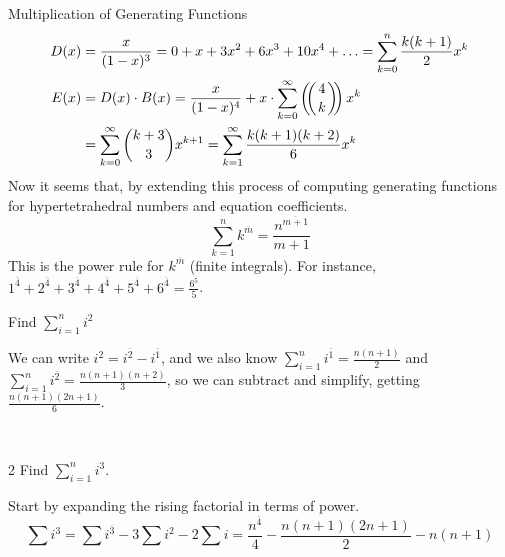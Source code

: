 \begin{subsection}{Multiplication of Generating Functions}
\begin{align*}
    D(x) &= \frac{x}{(1-x)^3} = 0 + x + 3x^2 + 6x^3 + 10x^4 + \ldots = \sum_{k = 0}^{n}\frac{k(k+1)}{2}x^k \\
    E(x) &= D(x)\cdot B(x) = \frac{x}{(1-x)^4} + x\cdot \sum_{k=0}^\infty \multiset{4}{k}x^k \\
    &= \sum_{k=0}^\infty \binom{k+3} 3 x^{k+1} = \sum_{k=1}^\infty \frac{k(k+1)(k+2)}{6}x^k
\end{align*}
Now it seems that, by extending this process of computing generating functions for hypertetrahedral numbers and equation coefficients. 
$$\sum_{k=1}^n k^{\overline{m}} = \frac{n^{\overline{m+1}}}{m+1}$$
This is the power rule for $k^{\overline{m}}$ (finite integrals).
For instance, $1^{\overline{4}} + 2^{\overline{4}} + 3^{\overline{4}} + 4^{\overline{4}} + 5^{\overline{4}} + 6^{\overline{4}} = \frac{6^{\overline{5}}}{5}$.
\begin{problem}{1}
Find $\sum_{i=1}^n i^2$
\end{problem}
\begin{solution}
We can write $i^2 = i^{\overline{2}} - i^{\overline{1}}$, and we also know
$\sum_{i=1}^n i^{\overline{1}} = \frac{n(n+1)}{2}$ and $\sum_{i=1}^n i^{\overline{2}} = \frac{n(n+1)(n+2)}{3}$, so we can subtract and simplify, getting $\frac{n(n+1)(2n+1)}{6}$.
\end{solution} \\
\begin{problem}2
    Find $\sum_{i=1}^n i^3$. 
\end{problem}
\begin{solution}
Start by expanding the rising factorial in terms of power.
$$\sum i^3 = \sum i^{\overline{3}} - 3\sum i^2 - 2\sum i = \frac{n^{\overline{4}}}{4} - \frac{n(n+1)(2n+1)}{2} - n(n+1)$$
\end{solution}

\end{subsection}
% 
